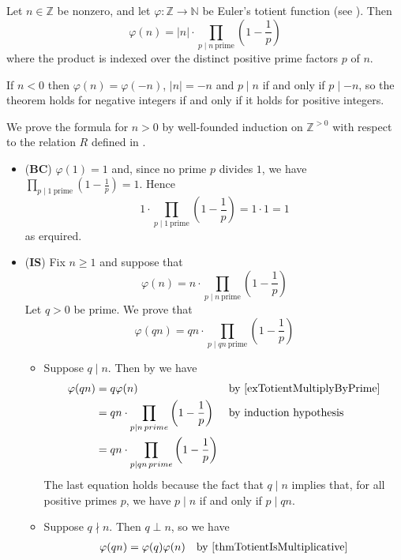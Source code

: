 \begin{theorem}
\label{thmFormulaForTotientFunction}
Let $n \in \mathbb{Z}$ be nonzero, and let $\varphi : \mathbb{Z} \to \mathbb{N}$ be Euler's totient function (see ). Then
\[ \varphi(n) = |n| \cdot \prod_{p \mid n\ \text{prime}} \left( 1-\frac{1}{p} \right) \]
where the product is indexed over the distinct positive prime factors $p$ of $n$.
\end{theorem}
\begin{cproof}
If $n < 0$ then $\varphi(n) = \varphi(-n)$, $|n| = -n$ and $p \mid n$ if and only if $p \mid {-n}$, so the theorem holds for negative integers if and only if it holds for positive integers.

We prove the formula for $n > 0$ by well-founded induction on $\mathbb{Z}^{>0}$ with respect to the relation $R$ defined in .
\begin{itemize}
\item (\textbf{BC}) $\varphi(1)=1$ and, since no prime $p$ divides $1$, we have $\prod_{p \mid 1\ \text{prime}} \left( 1-\frac{1}{p} \right) = 1$. Hence
\[ 1 \cdot \prod_{p \mid 1\ \text{prime}} \left( 1-\frac{1}{p} \right) = 1 \cdot 1 = 1 \]
as erquired.
\item (\textbf{IS}) Fix $n \ge 1$ and suppose that
\[ \varphi(n) = n \cdot \prod_{p \mid n\ \text{prime}} \left( 1-\frac{1}{p} \right) \]
Let $q > 0$ be prime. We prove that
\[ \varphi(qn) = qn \cdot \prod_{p \mid qn\ \text{prime}} \left( 1-\frac{1}{p} \right) \]
\begin{itemize}
\item Suppose $q \mid n$. Then by we have
\begin{align*}
\varphi(qn) &= q\varphi(n) && \text{by \Cref{exTotientMultiplyByPrime}} \\
&= qn \cdot \prod_{p \mid n\, prime} \left( 1-\frac{1}{p} \right) && \text{by induction hypothesis} \\
&= qn \cdot \prod_{p \mid qn\, prime} \left( 1-\frac{1}{p} \right) && 
\end{align*}
The last equation holds because the fact that $q \mid n$ implies that, for all positive primes $p$, we have $p \mid n$ if and only if $p \mid qn$.
\item Suppose $q \nmid n$. Then $q \perp n$, so we have
\begin{align*}
\varphi(qn) &= \varphi(q)\varphi(n) && \text{by \Cref{thmTotientIsMultiplicative}} \\

\end{align*}
\end{itemize}
\end{itemize}
\end{cproof}
